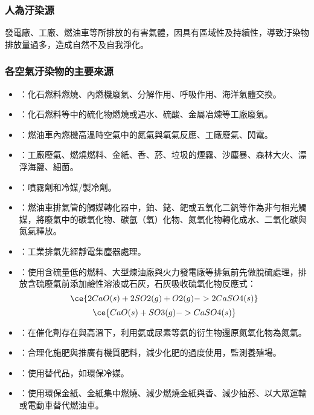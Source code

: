 \documentclass[a4paper,12pt]{report}
\begin{document}
\subsubsection{人為汙染源}
發電廠、工廠、燃油車等所排放的有害氣體，因具有區域性及持續性，導致汙染物排放量過多，造成自然不及自我淨化。
\subsubsection{各空氣汙染物的主要來源}
\begin{itemize}
\item{}：化石燃料燃燒、內燃機廢氣、分解作用、呼吸作用、海洋氣體交換。
\item{}：化石燃料等中的硫化物燃燒或遇水、硫酸、金屬冶煉等工廠廢氣。
\item{}：燃油車內燃機高溫時空氣中的氮氣與氧氣反應、工廠廢氣、閃電。
\item{}：工廠廢氣、燃燒燃料、金紙、香、菸、垃圾的煙霧、沙塵暴、森林大火、漂浮海鹽、細菌。
\item{}：噴霧劑和冷媒/製冷劑。
\end{itemize}
\begin{itemize}
\item {}：燃油車排氣管的觸媒轉化器中，鉑、銠、鈀或五氧化二釩等作為非勻相光觸媒，將廢氣中的碳氧化物、碳氫（氧）化物、氮氧化物轉化成水、二氧化碳與氮氣釋放。
\item {}：工業排氣先經靜電集塵器處理。
\item {}：使用含硫量低的燃料、大型煉油廠與火力發電廠等排氣前先做脫硫處理，排放含硫廢氣前添加鹼性溶液或石灰，石灰吸收硫氧化物反應式：
\[\ce{2CaO(s) + 2SO2(g) + O2(g) -> 2CaSO4(s)}\]
\[\ce{CaO(s) + SO3(g) -> CaSO4(s)}\]
\item {}：在催化劑存在與高溫下，利用氨或尿素等氨的衍生物還原氮氧化物為氮氣。
\item {}：合理化施肥與推廣有機質肥料，減少化肥的過度使用，監測養殖場。
\item {}：使用替代品，如環保冷媒。
\item {}：使用環保金紙、金紙集中燃燒、減少燃燒金紙與香、減少抽菸、以大眾運輸或電動車替代燃油車。
\end{itemize}
\end{document}
